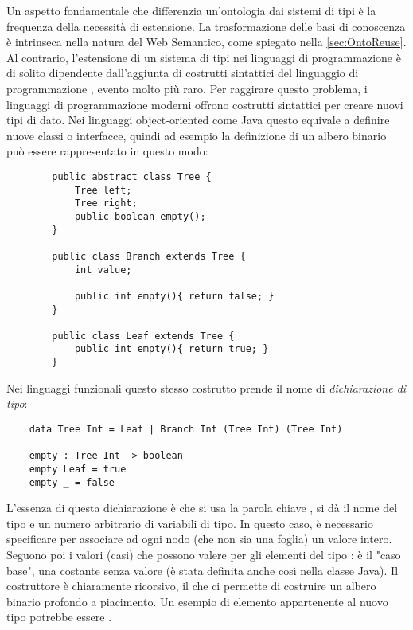 Un aspetto fondamentale che differenzia un'ontologia dai sistemi di tipi è la frequenza della necessità di estensione. La trasformazione delle basi di conoscenza è intrinseca nella natura del Web Semantico, come spiegato nella \autoref{sec:OntoReuse}. Al contrario, l'estensione di un sistema di tipi nei linguaggi di programmazione è di solito dipendente dall'aggiunta di costrutti sintattici del linguaggio di programmazione \cite{pierceTypesBook}, evento molto più raro. Per raggirare questo problema, i linguaggi di programmazione moderni offrono costrutti sintattici per creare nuovi tipi di dato. Nei linguaggi object-oriented come Java questo equivale a definire nuove classi o interfacce, quindi ad esempio la definizione di un albero binario può essere rappresentato in questo modo:
\begin{verbatim}
		public abstract class Tree {
			Tree left;
			Tree right;
			public boolean empty();
		}
		
		public class Branch extends Tree {
			int value;
		
			public int empty(){ return false; }
		}
		
		public class Leaf extends Tree {	
			public int empty(){ return true; }
		}
\end{verbatim}
Nei linguaggi funzionali questo stesso costrutto prende il nome di \textit{dichiarazione di tipo}:
\begin{verbatim}
	data Tree Int = Leaf | Branch Int (Tree Int) (Tree Int)
	
	empty : Tree Int -> boolean
	empty Leaf = true
	empty _ = false
\end{verbatim}
L'essenza di questa dichiarazione è che si usa la parola chiave , si dà il nome del tipo e un numero arbitrario di variabili di tipo. In questo caso, è necessario specificare  per associare ad ogni nodo (che non sia una foglia) un valore intero. Seguono poi i valori (casi) che possono valere per gli elementi del tipo :  è il "caso base", una costante senza valore (è stata definita anche così nella classe Java). Il costruttore  è chiaramente ricorsivo, il che ci permette di costruire un albero binario profondo a piacimento. Un esempio di elemento appartenente al nuovo tipo  potrebbe essere .

